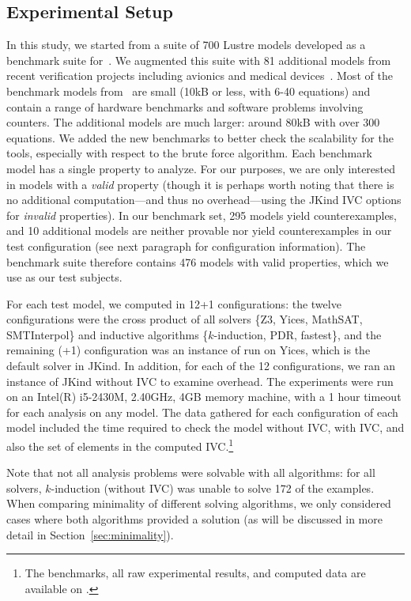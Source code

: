 \subsection{Experimental Setup}
In this study, we started from a suite of 700 Lustre models developed
as a benchmark suite for~\cite{Hagen08:FMCAD}. We augmented this suite
with 81 additional models from recent verification projects including
avionics and medical devices~\cite{QFCS15:backes,hilt2013}. Most of
the benchmark models from~\cite{Hagen08:FMCAD} are small (10kB or less,
with 6-40 equations) and contain a range of hardware benchmarks and
software problems involving counters. The additional models are much
larger: around 80kB with over 300 equations. We added the new
benchmarks to better check the scalability for the tools, especially
with respect to the brute force algorithm.
%
Each benchmark model has a single property to analyze.  For our purposes, we are only interested in models with a {\em valid} property (though it is perhaps worth noting that there is no additional computation---and thus no overhead---using the JKind IVC options for {\em invalid} properties).  In our benchmark set, 295 models yield counterexamples, and 10 additional models are neither provable nor yield counterexamples in our test configuration (see next paragraph for configuration information).  The benchmark suite therefore contains 476 models with valid properties, which we use as our test subjects.

For each test model, we computed \ucalg in 12+1 configurations: the
twelve configurations were the cross product of all solvers \{Z3,
Yices, MathSAT, SMTInterpol\} and inductive algorithms
\{$k$-induction, PDR, fastest\}, and the remaining (+1) configuration
was an instance of \bfalg run on Yices, which is the default solver in
JKind. In addition, for each of the 12 configurations, we ran an
instance of JKind without IVC to examine overhead. The experiments
were run on an Intel(R) i5-2430M, 2.40GHz, 4GB memory machine, with a
1 hour timeout for each analysis on any model. The data gathered for
each configuration of each model included the time required to check
the model without IVC, with IVC, and also the set of elements in the
computed IVC.\footnote{The benchmarks, all raw experimental results,
  and computed data are available on \cite{expr}.}

Note that not all analysis problems were solvable with all algorithms: for all solvers, $k$-induction (without IVC) was unable to solve 172 of the examples.  When comparing minimality of different solving algorithms, we only considered cases where both algorithms provided a solution (as will be discussed in more detail in Section~\ref{sec:minimality}).

